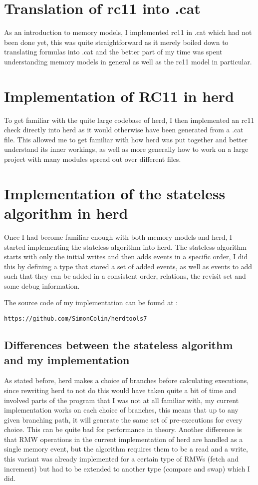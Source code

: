 \documentclass[a4,11pt,dvipsnames]{article}
\begin{document}
\section{Translation of rc11 into .cat}

As an introduction to memory models, I implemented rc11 in .cat which had not been done yet, this was quite straightforward as it merely boiled down to translating formulas into .cat and the better part of my time was spent understanding memory models in general as well as the rc11 model in particular.

\section{Implementation of RC11 in herd}

To get familiar with the quite large codebase of herd, I then implemented an rc11 check directly into herd as it would otherwise have been generated from a .cat file. This allowed me to get familiar with how herd was put together and better understand its inner workings, as well as more generally how to work on a large project with many modules spread out over different files.

\section{Implementation of the stateless algorithm in herd}

Once I had become familiar enough with both memory models and herd, I started implementing the stateless algorithm into herd. The stateless algorithm starts with only the initial writes and then adds events in a specific order, I did this by defining a type that stored a set of added events, as well as events to add such that they can be added in a consistent order, relations, the revisit set and some debug information.

The source code of my implementation can be found at :
\begin{lstlisting}
https://github.com/SimonColin/herdtools7
\end{lstlisting}

\subsection{Differences between the stateless algorithm and my implementation}

As stated before, herd makes a choice of branches before calculating executions, since rewriting herd to not do this would have taken quite a bit of time and involved parts of the program that I was not at all familiar with, my current implementation works on each choice of branches, this means that up to any given branching path, it will generate the same set of pre-executions for every choice. This can be quite bad for performance in theory. Another difference is that RMW operations in the current implementation of herd are handled as a single memory event, but the algorithm requires them to be a read and a write, this variant was already implemented for a certain type of RMWs (fetch and increment) but had to be extended to another type (compare and swap) which I did.
\end{document}
